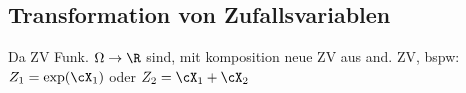 \subsection{Transformation von Zufallsvariablen}
Da ZV Funk. $\Omega \rightarrow \R$ sind, mit komposition neue ZV aus and. ZV, bspw:
$Z_1 = \exp(\cX_1)$ oder $Z_2 = \cX_1 + \cX_2$
